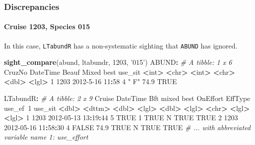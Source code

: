 \documentclass[
]{book}
\newenvironment{Shaded}{\begin{snugshade}}{\end{snugshade}}
\newcommand{\CommentTok}[1]{\textcolor[rgb]{0.56,0.35,0.01}{\textit{#1}}}
\newcommand{\DecValTok}[1]{\textcolor[rgb]{0.00,0.00,0.81}{#1}}
\newcommand{\ErrorTok}[1]{\textcolor[rgb]{0.64,0.00,0.00}{\textbf{#1}}}
\newcommand{\FloatTok}[1]{\textcolor[rgb]{0.00,0.00,0.81}{#1}}
\newcommand{\KeywordTok}[1]{\textcolor[rgb]{0.13,0.29,0.53}{\textbf{#1}}}
\newcommand{\NormalTok}[1]{#1}
\newcommand{\OperatorTok}[1]{\textcolor[rgb]{0.81,0.36,0.00}{\textbf{#1}}}
\newcommand{\OtherTok}[1]{\textcolor[rgb]{0.56,0.35,0.01}{#1}}
\newcommand{\StringTok}[1]{\textcolor[rgb]{0.31,0.60,0.02}{#1}}
\begin{document}
\hypertarget{discrepancies}{%
\subsubsection*{Discrepancies}\label{discrepancies}}

\hypertarget{cruise-1203-species-015}{%
\paragraph{Cruise 1203, Species 015}\label{cruise-1203-species-015}}

In this case, \texttt{LTabundR} has a non-systematic sighting that \texttt{ABUND} has ignored.

\begin{Shaded}
\begin{Highlighting}[]
\KeywordTok{sight_compare}\NormalTok{(abund, ltabundr, }\DecValTok{1203}\NormalTok{, }\StringTok{'015'}\NormalTok{)}
\NormalTok{ABUND}\OperatorTok{:}
\CommentTok{# A tibble: 1 x 6}
\StringTok{  }\NormalTok{CruzNo DateTime        Beauf Mixed  best use_sit}
   \OperatorTok{<}\NormalTok{int}\OperatorTok{>}\StringTok{ }\ErrorTok{<}\NormalTok{chr}\OperatorTok{>}\StringTok{           }\ErrorTok{<}\NormalTok{int}\OperatorTok{>}\StringTok{ }\ErrorTok{<}\NormalTok{chr}\OperatorTok{>}\StringTok{ }\ErrorTok{<}\NormalTok{dbl}\OperatorTok{>}\StringTok{ }\ErrorTok{<}\NormalTok{lgl}\OperatorTok{>}\StringTok{  }
\DecValTok{1}   \DecValTok{1203} \DecValTok{2012-5-16} \DecValTok{11}\OperatorTok{:}\DecValTok{58}     \DecValTok{4} \StringTok{" F"}   \FloatTok{74.9} \OtherTok{TRUE}   

\NormalTok{LTabundR}\OperatorTok{:}
\CommentTok{# A tibble: 2 x 9}
\StringTok{  }\NormalTok{Cruise DateTime              Bft mixed  best OnEffort EffType use_ef}\OperatorTok{~}\DecValTok{1}\NormalTok{ use_sit}
   \OperatorTok{<}\NormalTok{dbl}\OperatorTok{>}\StringTok{ }\ErrorTok{<}\NormalTok{dttm}\OperatorTok{>}\StringTok{              }\ErrorTok{<}\NormalTok{dbl}\OperatorTok{>}\StringTok{ }\ErrorTok{<}\NormalTok{lgl}\OperatorTok{>}\StringTok{ }\ErrorTok{<}\NormalTok{dbl}\OperatorTok{>}\StringTok{ }\ErrorTok{<}\NormalTok{lgl}\OperatorTok{>}\StringTok{    }\ErrorTok{<}\NormalTok{chr}\OperatorTok{>}\StringTok{   }\ErrorTok{<}\NormalTok{lgl}\OperatorTok{>}\StringTok{    }\ErrorTok{<}\NormalTok{lgl}\OperatorTok{>}\StringTok{  }
\DecValTok{1}   \DecValTok{1203} \DecValTok{2012-05-13} \DecValTok{13}\OperatorTok{:}\DecValTok{19}\OperatorTok{:}\DecValTok{44}     \DecValTok{5} \OtherTok{TRUE}    \DecValTok{1}   \OtherTok{TRUE}\NormalTok{     N       }\OtherTok{TRUE}     \OtherTok{TRUE}   
\DecValTok{2}   \DecValTok{1203} \DecValTok{2012-05-16} \DecValTok{11}\OperatorTok{:}\DecValTok{58}\OperatorTok{:}\DecValTok{30}     \DecValTok{4} \OtherTok{FALSE}  \FloatTok{74.9} \OtherTok{TRUE}\NormalTok{     N       }\OtherTok{TRUE}     \OtherTok{TRUE}   
\CommentTok{# ... with abbreviated variable name 1: use_effort}
\end{Highlighting}
\end{Shaded}
\end{document}
